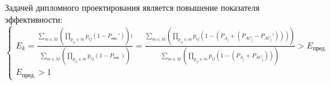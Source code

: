 
\vspace{\baselineskip}
Задачей дипломного проектирования является повышение показателя эффективности:
\begin{equation}
  \label{eq:mathtask}
\begin{cases}
   E_k=\frac{\sum_{m \in M} (\prod_{p_{ij} \in m} p_{ij}(1-P_{\textrm{ош.}}')))}{\sum_{m \in M} (\prod_{p_{ij} \in m} p_{ij}(1-P_{\textrm{ош.}}))} = \frac{\sum_{m \in M} (\prod_{p_{ij} \in m} p_{ij}(1-(P_{A_j}+(P_{{AC}_j}-P_{{AC}_j}'))))}{\sum_{m \in M} (\prod_{p_{ij} \in m} p_{ij}(1-(P_{A_j}+P_{{AC}_j})))} > E_{\textrm{пред.}} \\
   E_{\textrm{пред.}} > 1
  \end{cases}
\end{equation}

